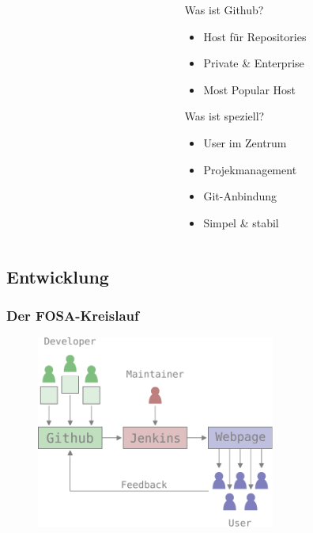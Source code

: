 \begin{frame}
\begin{columns}
\begin{column}{5cm}
\begin{figure}
			\end{figure}
		\end{column}
		\begin{column}{5cm}
			\begin{block}{Was ist Github?}
		                \begin{itemize}
					\item Host für Repositories
					\item Private \& Enterprise
					\item Most Popular Host
				\end{itemize}
			\end{block}
			\begin{block}{Was ist speziell?}
				\begin{itemize}
					\item User im Zentrum
					\item Projekmanagement
					\item Git-Anbindung
					\item Simpel \& stabil
				\end{itemize}
			\end{block}
		\end{column}
	\end{columns}
\end{frame}

\subsection{Entwicklung}
\begin{frame}
	\frametitle{Der FOSA-Kreislauf}
	\begin{figure}
		\centering
		\includegraphics[width=0.7\textwidth]{fig/fosa-loop-0.pdf}

	\end{figure}
\end{frame}

